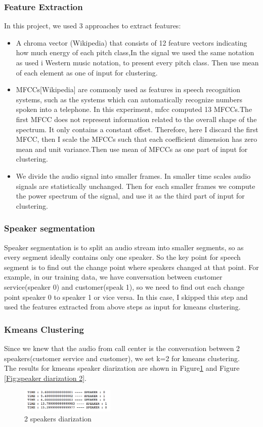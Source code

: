 \documentclass[journal, a4paper]{IEEEtran}
\begin{document}
\subsubsection{Feature Extraction}
In this project, we used 3 approaches to extract features:
\begin{itemize}
    \item A chroma vector (Wikipedia) that consists of 12 feature vectors indicating how much energy of each pitch class,In the signal we used the same notation as used i Western music notation, to present every pitch class. Then use mean of each element as one of input for clustering.
    \item MFCCs[Wikipedia] are commonly used as features in speech recognition systems, such as the systems which can automatically recognize numbers spoken into a telephone. In this experiment, mfcc computed 13 MFCCs.The first MFCC does not represent information related to the overall shape of the spectrum. It only contains a constant offset. Therefore, here I discard the first MFCC, then I scale the MFCCs such that each coefficient dimension has zero mean and unit variance.Then use mean of MFCCs as one part of input for clustering.
    \item We divide the audio signal into smaller frames. In smaller time scales audio signals are statistically unchanged. Then for each smaller frames we compute the power spectrum of the signal, and use it as the third part of input for clustering.
\end{itemize}
\subsubsection{Speaker segmentation}\cite{Segmentation} Speaker segmentation is to split an audio stream into smaller segments, so as every segment ideally contains only one speaker. So the key point for speech segment is to find out the change point where speakers changed at that point. For example, in our training data, we have conversation between customer service(speaker 0) and customer(speak 1), so we need to find out each change point speaker 0 to speaker 1 or vice versa. In this case, I skipped this step and used the features extracted from above steps as input for kmeans clustering.
\subsubsection{Kmeans Clustering}
Since we knew that the audio from call center is the conversation between 2 speakers(customer service and customer), we set k=2 for kmeans clustering.\\
The results for kmeans speaker diarization are shown in Figure\ref{Fig:speaker diarization 1} and Figure \ref{Fig:speaker diarization 2}.
\begin{figure}[h!]
    \centering  
     \caption{\label{Fig:speaker diarization 1}2 speakers diarization}  
    \includegraphics[width=0.4\textwidth]{kmeans01.png} 
\end{figure}
\end{document}
